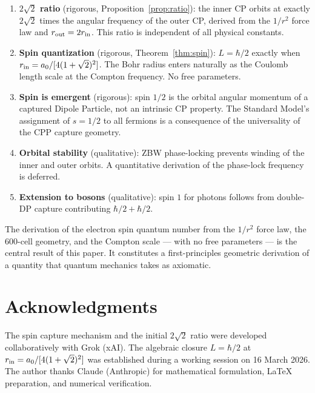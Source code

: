 \documentclass[12pt]{article}
\newcommand{\rin}{r_{\rm in}}
\newcommand{\rout}{r_{\rm out}}
\newcommand{\aBohr}{a_0}
\begin{document}
\begin{enumerate}
  \item \textbf{$2\sqrt{2}$ ratio} (rigorous, Proposition~\ref{prop:ratio}):
    the inner CP orbits at exactly $2\sqrt{2}$ times the angular
    frequency of the outer CP, derived from the $1/r^2$ force law and
    $\rout = 2\rin$.  This ratio is independent of all physical
    constants.

  \item \textbf{Spin quantization} (rigorous, Theorem~\ref{thm:spin}):
    $L = \hbar/2$ exactly when $\rin = \aBohr/[4(1+\sqrt{2})^2]$.
    The Bohr radius enters naturally as the Coulomb length scale at
    the Compton frequency.  No free parameters.

  \item \textbf{Spin is emergent} (rigorous): spin $1/2$ is the
    orbital angular momentum of a captured Dipole Particle, not an
    intrinsic CP property.  The Standard Model's assignment of
    $s = 1/2$ to all fermions is a consequence of the universality of
    the CPP capture geometry.

  \item \textbf{Orbital stability} (qualitative): ZBW phase-locking
    prevents winding of the inner and outer orbits.  A quantitative
    derivation of the phase-lock frequency is deferred.

  \item \textbf{Extension to bosons} (qualitative): spin $1$ for
    photons follows from double-DP capture contributing $\hbar/2 +
    \hbar/2$.
\end{enumerate}

The derivation of the electron spin quantum number from the $1/r^2$
force law, the 600-cell geometry, and the Compton scale --- with no
free parameters --- is the central result of this paper.  It
constitutes a first-principles geometric derivation of a quantity
that quantum mechanics takes as axiomatic.

\section*{Acknowledgments}

The spin capture mechanism and the initial $2\sqrt{2}$ ratio were
developed collaboratively with Grok (xAI).  The algebraic closure
$L = \hbar/2$ at $\rin = \aBohr/[4(1+\sqrt{2})^2]$ was established
during a working session on 16 March 2026.  The author thanks Claude
(Anthropic) for mathematical formulation, LaTeX preparation, and
numerical verification.
\end{document}
